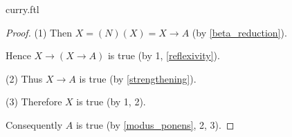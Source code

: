 \documentclass{stex}
\newcommand{\app}[2]{(#1)(#2)}
\begin{document}
\begin{smodule}{curry.ftl}
\begin{forthel}
\begin{proof}
      (1) Then $X = \app{N}{X} = X \rightarrow A$ (by \cref{beta_reduction}).

      Hence $X \rightarrow (X \rightarrow A)$ is true (by 1, \cref{reflexivity}).

      (2) Thus $X \rightarrow A$ is true (by \cref{strengthening}).

      (3) Therefore $X$ is true (by 1, 2).

      Consequently $A$ is true (by \cref{modus_ponens}, 2, 3).
    \end{proof}
  \end{forthel}
\end{smodule}
\printbibliography
\end{document}
